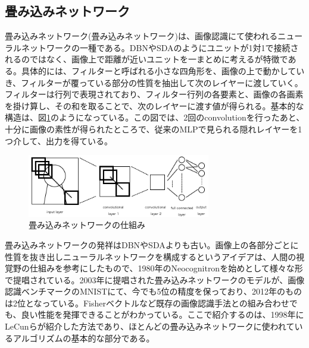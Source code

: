 \subsection{畳み込みネットワーク}
畳み込みネットワーク(畳み込みネットワーク)は、画像認識にて使われるニューラルネットワークの一種である。DBNやSDAのようにユニットが1対1で接続されるのではなく、画像上で距離が近いユニットを一まとめに考えるが特徴である。具体的には、フィルターと呼ばれる小さな四角形を、画像の上で動かしていき、フィルターが覆っている部分の性質を抽出して次のレイヤーに渡していく。フィルターは行列で表現されており、フィルター行列の各要素と、画像の各画素を掛け算し、その和を取ることで、次のレイヤーに渡す値が得られる。基本的な構造は、図\ref{c3_convolution}のようになっている。この図では、2回のconvolutionを行ったあと、十分に画像の素性が得られたところで、従来のMLPで見られる隠れレイヤーを1つ介して、出力を得ている。\par
\begin{figure}[tbp]
 \centering
  \includegraphics[width=80mm]{img/c3/convolution}
 \caption{畳み込みネットワークの仕組み}
 \label{c3_convolution}
\end{figure}
畳み込みネットワークの発祥はDBNやSDAよりも古い。画像上の各部分ごとに性質を抜き出しニューラルネットワークを構成するというアイデアは、人間の視覚野の仕組みを参考にしたもので、1980年のNeocognitronを始めとして\cite{fukushima1980neocognitron}\cite{fukushima1983neocognitron}様々な形で提唱されている\cite{lecun1998gradient-based}\cite{serre2007robust}。2003年に提唱された畳み込みネットワークのモデルが、画像認識ベンチマークのMNISTにて、今でも5位の精度を保っており\cite{simard2003best}、2012年のものは2位となっている\cite{ciresan2012multi-column}。Fisherベクトルなど既存の画像認識手法との組み合わせでも、良い性能を発揮できることがわかっている\cite{nakayama2013efficient}。ここで紹介するのは、1998年にLeCunらが紹介した方法\cite{lecun1998gradient-based}であり、ほとんどの畳み込みネットワークに使われているアルゴリズムの基本的な部分である。
